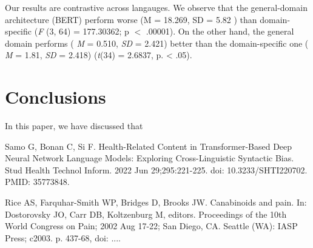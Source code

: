 \documentclass{IOS-Book-Article}
\begin{document}
Our results are contrastive across langauges. We observe that the general-domain architecture (BERT) perform worse (M = 18.269, SD = 5.82 ) than domain-specific (\textit{F} (3, 64) = 177.30362; p $<$ .00001). On the other hand, the general domain performs ( \textit{M} = 0.510, \textit{SD} = 2.421) better than the domain-specific one ( \textit{M} = 1.81, \textit{SD} = 2.418) (\textit{t}(34) = 2.6837, p. < .05).

\section{Conclusions}
In this paper, we have discussed that 

\begin{thebibliography}{99}


Samo G, Bonan C, Si F. Health-Related Content in Transformer-Based Deep Neural Network Language Models: Exploring Cross-Linguistic Syntactic Bias. Stud Health Technol Inform. 2022 Jun 29;295:221-225. doi: 10.3233/SHTI220702. PMID: 35773848.

Rice AS, Farquhar-Smith WP, Bridges D, Brooks JW. Canabinoids and pain. In: Dostorovsky JO,
Carr DB, Koltzenburg M, editors. Proceedings of the 10th World Congress on Pain;  2002 Aug
17-22; San Diego, CA. Seattle (WA): IASP Press; c2003. p. 437-68, doi: ....

\end{thebibliography}
\end{document}
